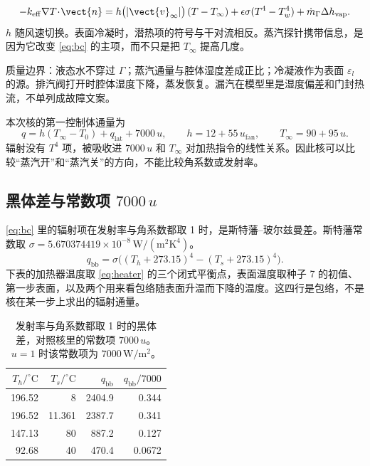 \begin{equation}
\label{eq:bc}
-k_{\mathrm{eff}}\nabla T\!\cdot\!\vect{n}
=h\big(|\vect{v}_\infty|\big)\,(T-T_\infty)
+\epsilon\sigma(T^4-T_w^4)
+\dot m_{\Gamma}\Delta h_{\mathrm{vap}}.
\end{equation}
\(h\) 随风速切换。表面冷凝时，潜热项的符号与干对流相反。蒸汽探针携带信息，是因为它改变 \eqref{eq:bc} 的主项，而不只是把 \(T_\infty\) 提高几度。

质量边界：液态水不穿过 \(\Gamma\)；蒸汽通量与腔体湿度差成正比；冷凝液作为表面 \(\varepsilon_l\) 的源。排汽阀打开时腔体湿度下降，蒸发恢复。漏汽在模型里是湿度偏差和门封热流，不单列成故障文案。

本次核的第一控制体通量为
\begin{equation}
q=h(T_\infty-T_0)+q_{\mathrm{lat}}+7000\,u,\qquad h=12+55\,u_{\mathrm{fan}},\qquad T_\infty=90+95\,u.
\end{equation}
辐射没有 \(T^4\) 项，被吸收进 \(7000\,u\) 和 \(T_\infty\) 对加热指令的线性关系。因此核可以比较“蒸汽开”和“蒸汽关”的方向，不能比较角系数或发射率。

\subsection{黑体差与常数项 \(7000\,u\)}

\eqref{eq:bc} 里的辐射项在发射率与角系数都取 1 时，是斯特藩–玻尔兹曼差。斯特藩常数取 \(\sigma=5.670374419\times 10^{-8}\,\mathrm{W}/(\mathrm{m}^2\mathrm{K}^4)\)。
\begin{equation}
\label{eq:sb}
q_{\mathrm{bb}}=\sigma\big((T_h+273.15)^4-(T_s+273.15)^4\big).
\end{equation}
下表的加热器温度取 \eqref{eq:heater} 的三个闭式平衡点，表面温度取种子 7 的初值、第一步表面，以及两个用来看包络随表面升温而下降的温度。这四行是包络，不是核在某一步上求出的辐射通量。

\begin{table}[ht]
\centering
\caption{发射率与角系数都取 1 时的黑体差，对照核里的常数项 \(7000\,u\)。\(u=1\) 时该常数项为 \(7000\,\mathrm{W}/\mathrm{m}^2\)。}
\begin{tabular}{rrrr}
\toprule
\(T_h/^\circ\mathrm{C}\) & \(T_s/^\circ\mathrm{C}\) & \(q_{\mathrm{bb}}\) & \(q_{\mathrm{bb}}/7000\) \\
\midrule
196.52 & 8 & 2404.9 & 0.344 \\
196.52 & 11.361 & 2387.7 & 0.341 \\
147.13 & 80 & 887.2 & 0.127 \\
92.68 & 40 & 470.4 & 0.0672 \\
\bottomrule
\end{tabular}
\end{table}


